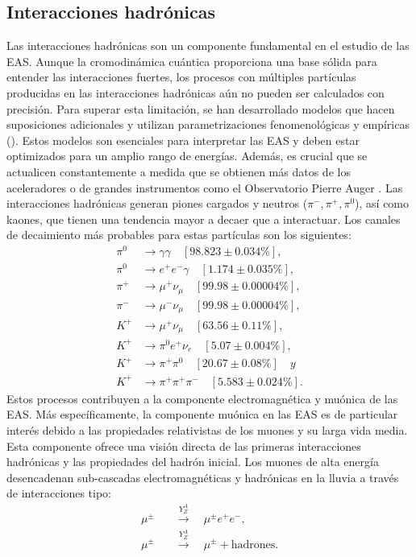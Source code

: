 \subsection{Interacciones hadrónicas}
Las interacciones hadrónicas son un componente fundamental en el estudio de las EAS. Aunque la cromodinámica cuántica proporciona una base sólida para entender las interacciones fuertes, los procesos con múltiples partículas producidas en las interacciones hadrónicas aún no pueden ser calculados con precisión. Para superar esta limitación, se han desarrollado modelos que hacen suposiciones adicionales y utilizan parametrizaciones fenomenológicas y empíricas (\cite{Allen}). Estos modelos son esenciales para interpretar las EAS y deben estar optimizados para un amplio rango de energías. Además, es crucial que se actualicen constantemente a medida que se obtienen más datos de los aceleradores o de grandes instrumentos como el Observatorio Pierre Auger \cite{andrada_2021}. Las interacciones hadrónicas generan piones cargados y neutros ($\pi^{-},\pi^{+},\pi^{0}$), así como kaones, que tienen una tendencia mayor a decaer que a interactuar. Los canales de decaimiento más probables para estas partículas son los siguientes:
\begin{align*}
\pi^{0} &\rightarrow \gamma\gamma \quad [{98.823 \pm 0.034}{\%}], \\
\pi^{0} &\rightarrow e^{+}e^{-} \gamma \quad [{1.174 \pm 0.035}{\%}], \\
\pi^{+} &\rightarrow \mu^{+}\nu_{\mu} \quad [{99.98 \pm 0.00004}{\%}], \\
\pi^{-} &\rightarrow \mu^{-}\nu_{\mu} \quad [{99.98 \pm 0.00004}{\%}], \\
K^{+} &\rightarrow \mu^{+}\nu_{\mu} \quad [{63.56 \pm 0.11}{\%}], \\
K^{+} &\rightarrow \pi^{0}e^{+}\nu_{e} \quad [{5.07 \pm 0.004}{\%}], \\
K^{+} &\rightarrow \pi^{+}\pi^{0} \quad [{20.67 \pm 0.08}{\%}] \quad y \\
K^{+} &\rightarrow \pi^{+}\pi^{+}\pi^{-} \quad [{5.583 \pm 0.024}{\%}].
\end{align*}
Estos procesos contribuyen a la componente electromagnética y muónica de las EAS. Más específicamente, la componente muónica en las EAS es de particular interés debido a las propiedades relativistas de los muones y su larga vida media. Esta componente ofrece una visión directa de las primeras interacciones hadrónicas y las propiedades del hadrón inicial. Los muones de alta energía desencadenan sub-cascadas electromagnéticas y hadrónicas en la lluvia a través de interacciones tipo:
\begin{align}
\mu^{\pm} \quad &\xrightarrow{Y^{A}_{Z}} \quad \mu^{\pm}e^{+}e^{-}, \\
\mu^{\pm} \quad &\xrightarrow{Y^{A}_{Z}} \quad \mu^{\pm} + \text{hadrones}.
\end{align}
